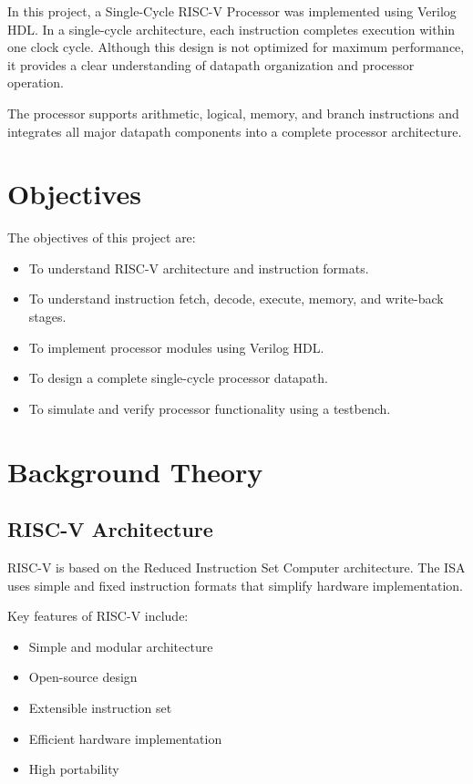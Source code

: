 \documentclass[conference]{IEEEtran}
\begin{document}
In this project, a Single-Cycle RISC-V Processor was implemented using Verilog HDL. In a single-cycle architecture, each instruction completes execution within one clock cycle. Although this design is not optimized for maximum performance, it provides a clear understanding of datapath organization and processor operation.

The processor supports arithmetic, logical, memory, and branch instructions and integrates all major datapath components into a complete processor architecture.


\section{Objectives}

The objectives of this project are:

\begin{itemize}
    \item To understand RISC-V architecture and instruction formats.
    \item To understand instruction fetch, decode, execute, memory, and write-back stages.
    \item To implement processor modules using Verilog HDL.
    \item To design a complete single-cycle processor datapath.
    \item To simulate and verify processor functionality using a testbench.
\end{itemize}


\section{Background Theory}

\subsection{RISC-V Architecture}

RISC-V is based on the Reduced Instruction Set Computer architecture. The ISA uses simple and fixed instruction formats that simplify hardware implementation.

Key features of RISC-V include:

\begin{itemize}
    \item Simple and modular architecture
    \item Open-source design
    \item Extensible instruction set
    \item Efficient hardware implementation
    \item High portability
\end{itemize}
\end{document}
